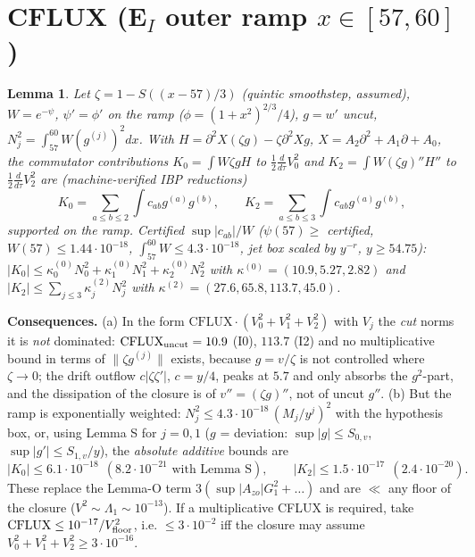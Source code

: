 \documentclass[11pt]{article}
\newtheorem{lem}{Lemma}\newtheorem{prop}{Proposition}
\begin{document}
\section{CFLUX (E$_I$ outer ramp $x\in[57,60]$)}
\begin{lem}
Let $\zeta=1-S((x-57)/3)$ (quintic smoothstep, assumed), $W=e^{-\psi}$, $\psi'=\phi'$ on the ramp ($\phi=(1+x^2)^{2/3}/4$), $g=w'$ uncut, $N_j^2=\int_{57}^{60}W(g^{(j)})^2dx$. With $H=\partial^2X(\zeta g)-\zeta\partial^2Xg$, $X=A_2\partial^2+A_1\partial+A_0$, the commutator contributions $K_0=\int W\zeta gH$ to $\tfrac12\frac d{d\tau}V_0^2$ and $K_2=\int W(\zeta g)''H''$ to $\tfrac12\frac d{d\tau}V_2^2$ are (machine-verified IBP reductions)
$$K_0=\sum_{a\le b\le2}\int c_{ab}g^{(a)}g^{(b)},\qquad K_2=\sum_{a\le b\le3}\int c_{ab}g^{(a)}g^{(b)},$$
supported on the ramp. Certified $\sup|c_{ab}|/W$ ($\psi(57)\ge$ certified, $W(57)\le1.44\cdot10^{-18}$, $\int_{57}^{60}W\le4.3\cdot10^{-18}$, jet box scaled by $y^{-r}$, $y\ge54.75$): $|K_0|\le\kappa^{(0)}_0N_0^2+\kappa^{(0)}_1N_1^2+\kappa^{(0)}_2N_2^2$ with $\kappa^{(0)}=(10.9,5.27,2.82)$ and $|K_2|\le\sum_{j\le3}\kappa^{(2)}_jN_j^2$ with $\kappa^{(2)}=(27.6,65.8,113.7,45.0)$.
\end{lem}
\textbf{Consequences.} (a) In the form $\mathrm{CFLUX}\cdot(V_0^2+V_1^2+V_2^2)$ with $V_j$ the \emph{cut} norms it is \emph{not} dominated: $\mathrm{CFLUX}_{\rm uncut}=10.9$ (I0), $113.7$ (I2) and no multiplicative bound in terms of $\|\zeta g^{(j)}\|$ exists, because $g=v/\zeta$ is not controlled where $\zeta\to0$; the drift outflow $c|\zeta\zeta'|$, $c=y/4$, peaks at $5.7$ and only absorbs the $g^2$-part, and the dissipation of the closure is of $v''=(\zeta g)''$, not of uncut $g''$. (b) But the ramp is exponentially weighted: $N_j^2\le4.3\cdot10^{-18}\,(M_j/y^j)^2$ with the hypothesis box, or, using Lemma S for $j=0,1$ ($g$ = deviation: $\sup|g|\le S_{0,v}$, $\sup|g'|\le S_{1,v}/y$), the \emph{absolute additive} bounds are
$$|K_0|\le6.1\cdot10^{-18}\ \ (8.2\cdot10^{-21}\text{ with Lemma S}),\qquad |K_2|\le1.5\cdot10^{-17}\ \ (2.4\cdot10^{-20}).$$
These replace the Lemma-O term $3(\sup|A_{zo}|G_1^2+\dots)$ and are $\ll$ any floor of the closure ($V^2\sim\Lambda_1\sim10^{-13}$). If a multiplicative CFLUX is required, take $\mathrm{CFLUX}\le10^{-17}/V_{\rm floor}^2$, i.e. $\le3\cdot10^{-2}$ iff the closure may assume $V_0^2+V_1^2+V_2^2\ge3\cdot10^{-16}$.
\end{document}
